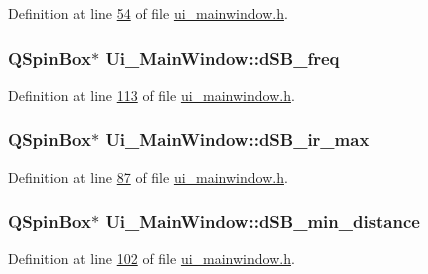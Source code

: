 Definition at line \hyperlink{a00052_source_l00054}{54} of file \hyperlink{a00052_source}{ui\+\_\+mainwindow.\+h}.

\hypertarget{a00027_abd528de839feccc001dc62b3aecddc9f}{
\subsubsection[{d\+S\+B\+\_\+freq}]{\setlength{\rightskip}{0pt plus 5cm}Q\+Spin\+Box$\ast$ Ui\+\_\+\+Main\+Window\+::d\+S\+B\+\_\+freq}}\label{a00027_abd528de839feccc001dc62b3aecddc9f}


Definition at line \hyperlink{a00052_source_l00113}{113} of file \hyperlink{a00052_source}{ui\+\_\+mainwindow.\+h}.

\hypertarget{a00027_a220706f1fd93857145032c897e55d9e3}{
\subsubsection[{d\+S\+B\+\_\+ir\+\_\+max}]{\setlength{\rightskip}{0pt plus 5cm}Q\+Spin\+Box$\ast$ Ui\+\_\+\+Main\+Window\+::d\+S\+B\+\_\+ir\+\_\+max}}\label{a00027_a220706f1fd93857145032c897e55d9e3}


Definition at line \hyperlink{a00052_source_l00087}{87} of file \hyperlink{a00052_source}{ui\+\_\+mainwindow.\+h}.

\hypertarget{a00027_a01c23085590f4947828948bbd9f50cc7}{
\subsubsection[{d\+S\+B\+\_\+min\+\_\+distance}]{\setlength{\rightskip}{0pt plus 5cm}Q\+Spin\+Box$\ast$ Ui\+\_\+\+Main\+Window\+::d\+S\+B\+\_\+min\+\_\+distance}}\label{a00027_a01c23085590f4947828948bbd9f50cc7}


Definition at line \hyperlink{a00052_source_l00102}{102} of file \hyperlink{a00052_source}{ui\+\_\+mainwindow.\+h}.

